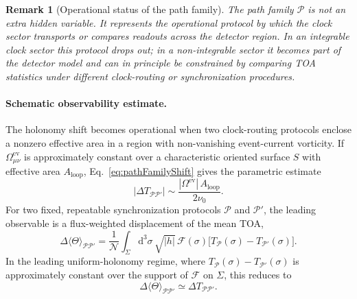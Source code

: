 \documentclass[pdflatex,sn-mathphys-num]{sn-jnl}
\theoremstyle{thmstylethree}
\theoremstyle{thmstyleone}
\theoremstyle{thmstyletwo}
\newtheorem{remark}{Remark}[section]
\numberwithin{equation}{section}
\newcommand{\dd}{\mathrm{d}}
\begin{document}
        \begin{remark}[Operational status of the path family]
            The path family $\mathcal{P}$ is not an extra hidden variable. It represents the operational protocol by which the clock sector transports or compares readouts across the detector region. In an integrable clock sector this protocol drops out; in a non-integrable sector it becomes part of the detector model and can in principle be constrained by comparing TOA statistics under different clock-routing or synchronization procedures.
        \end{remark}

        \paragraph{Schematic observability estimate.}
            The holonomy shift becomes operational when two clock-routing protocols enclose a nonzero effective area in a region with non-vanishing event-current vorticity. If $\Omega^{\mathrm{ev}}_{\mu\nu}$ is approximately constant over a characteristic oriented surface $S$ with effective area $A_{\mathrm{loop}}$, Eq.~\eqref{eq:pathFamilyShift} gives the parametric estimate
            \begin{equation}
                \left|\Delta T_{\mathcal{P}\mathcal{P}'}\right|
                \sim
                \frac{|\Omega^{\mathrm{ev}}|\,A_{\mathrm{loop}}}{2\nu_0}.
                \label{eq:holonomyEstimate}
            \end{equation}
            For two fixed, repeatable synchronization protocols $\mathcal{P}$ and $\mathcal{P}'$, the leading observable is a flux-weighted displacement of the mean TOA,
            \begin{equation}
                \Delta\langle\Theta\rangle_{\mathcal{P}\mathcal{P}'}
                =
                \frac{1}{\mathcal{N}}
                \int_{\Sigma}\dd^3\sigma\,\sqrt{|h|}\,
                \mathcal{F}(\sigma)
                \big[T_{\mathcal{P}}(\sigma)-T_{\mathcal{P}'}(\sigma)\big].
                \label{eq:holonomyMeanShiftGeneral}
            \end{equation}
            In the leading uniform-holonomy regime, where $T_{\mathcal{P}}(\sigma)-T_{\mathcal{P}'}(\sigma)$ is approximately constant over the support of $\mathcal{F}$ on $\Sigma$, this reduces to
            \begin{equation}
                \Delta\langle\Theta\rangle_{\mathcal{P}\mathcal{P}'}
                \simeq
                \Delta T_{\mathcal{P}\mathcal{P}'}.
                \label{eq:holonomyMeanShift}
            \end{equation}
\end{document}
